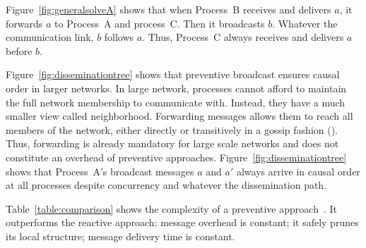 Figure~\ref{fig:generalsolveA} shows that when Process~B receives and delivers
$a$, it forwards $a$ to Process~A and process~C. Then it broadcasts
$b$. Whatever the communication link, $b$ follows $a$. Thus, Process~C always
receives and delivers $a$ before $b$.

Figure~\ref{fig:disseminationtree} shows that preventive broadcast ensures
causal order in larger networks. In large network, processes cannot afford to
maintain the full network membership to communicate with. Instead, they have a
much smaller view called neighborhood. Forwarding messages allows them to reach
all members of the network, either directly or transitively in a gossip fashion
(\REF). Thus, forwarding is already mandatory for large scale networks and does
not constitute an overhead of preventive approaches.
Figure~\ref{fig:disseminationtree} shows that Process~A's broadcast messages $a$
and $a'$ always arrive in causal order at all processes despite concurrency and
whatever the dissemination path.



Table~\ref{table:comparison} shows the complexity of a preventive
approach~\cite{friedman2004causal}. It outperforms the reactive approach:
message overhead is constant; it safely prunes its local structure; message
delivery time is constant.


